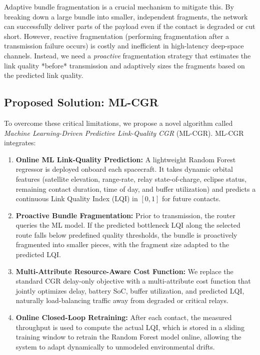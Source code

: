\documentclass[a4paper,fleqn]{cas-dc}
\newcommand{\mlcgr}{\textsf{ML-CGR}}
\begin{document}
Adaptive bundle fragmentation is a crucial mechanism to mitigate this. By breaking down a large bundle into smaller, independent fragments, the network can successfully deliver parts of the payload even if the contact is degraded or cut short. However, reactive fragmentation (performing fragmentation after a transmission failure occurs) is costly and inefficient in high-latency deep-space channels. Instead, we need a \emph{proactive} fragmentation strategy that estimates the link quality *before* transmission and adaptively sizes the fragments based on the predicted link quality.

\subsection{Proposed Solution: ML-CGR}
To overcome these critical limitations, we propose a novel algorithm called \emph{Machine Learning-Driven Predictive Link-Quality CGR} (\mlcgr{}). \mlcgr{} integrates:
\begin{enumerate}
    \item \textbf{Online ML Link-Quality Prediction:} A lightweight Random Forest regressor is deployed onboard each spacecraft. It takes dynamic orbital features (satellite elevation, range-rate, relay state-of-charge, eclipse status, remaining contact duration, time of day, and buffer utilization) and predicts a continuous Link Quality Index (LQI) in $[0, 1]$ for future contacts.
    \item \textbf{Proactive Bundle Fragmentation:} Prior to transmission, the router queries the ML model. If the predicted bottleneck LQI along the selected route falls below predefined quality thresholds, the bundle is proactively fragmented into smaller pieces, with the fragment size adapted to the predicted LQI.
    \item \textbf{Multi-Attribute Resource-Aware Cost Function:} We replace the standard CGR delay-only objective with a multi-attribute cost function that jointly optimizes delay, battery SoC, buffer utilization, and predicted LQI, naturally load-balancing traffic away from degraded or critical relays.
    \item \textbf{Online Closed-Loop Retraining:} After each contact, the measured throughput is used to compute the actual LQI, which is stored in a sliding training window to retrain the Random Forest model online, allowing the system to adapt dynamically to unmodeled environmental drifts.
\end{enumerate}
\end{document}
